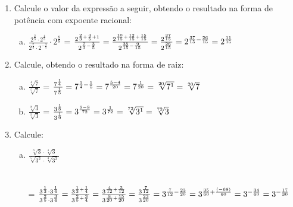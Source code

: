 \documentclass[a4paper,14pt]{article}
\begin{document}
\begin{multicols}{2}
\begin{enumerate}
\begin{enumerate}[a)]
        \end{enumerate}
        \item Calcule o valor da expressão a seguir, obtendo o resultado na forma de potência com expoente racional:
        \begin{enumerate}[a)]
        	\item $\frac{2^\frac{2}{3} \cdot 2^\frac{4}{5}}{2^\frac{7}{3} \cdot 2^{-\frac{3}{5}}} \cdot 2^\frac{8}{8}$ = $\frac{2^{\frac{2}{3} + \frac{4}{5} + 1}}{2^{\frac{7}{3} - \frac{3}{5}}} \\\\ = \frac{2^{\frac{10}{15} + \frac{12}{15} + \frac{15}{15}}}{2^{\frac{35}{15} - \frac{9}{15}}} = \frac{2^\frac{37}{15}}{2^\frac{26}{15}} = 2^{\frac{37}{15} - \frac{26}{15}} \\\\= 2^\frac{11}{15}$
        \end{enumerate}
        \item Calcule, obtendo o resultado na forma de raiz:
        \begin{enumerate}[a)]
        	\item $\frac{\sqrt[4]{7}}{\sqrt[5]{7}}$ = $\frac{7^\frac{1}{4}}{7^\frac{1}{5}} = 7^{\frac{1}{4} - \frac{1}{5}} = 7^\frac{5 - 4}{20} \\= 7^\frac{1}{20} = \sqrt[20]{7^1} = \sqrt[20]{7}$ \\
        	\item $\frac{\sqrt[8]{3}}{\sqrt[9]{3}}$ = $\frac{3^\frac{1}{8}}{3^\frac{1}{9}} = 3^\frac{9-8}{72} = 3^\frac{1}{72} \\= \sqrt[72]{3^1} = \sqrt[72]{3}$\\
        \end{enumerate}
        \item Calcule:
        \begin{enumerate}[a)]
            \item $\frac{\sqrt[3]{3} \cdot \sqrt[4]{3}}{\sqrt[5]{3^2} \cdot \sqrt[4]{3^3}}$ \\\\\\= $\frac{3^\frac{1}{3} \cdot 3^\frac{1}{4}}{3^\frac{2}{5} \cdot 3^\frac{3}{4}} = \frac{3^{\frac{1}{3} + \frac{1}{4}}}{3^{\frac{2}{5} + \frac{3}{4}}} = \frac{3^{\frac{4}{12} + \frac{3}{12}}}{3^{\frac{8}{20} + \frac{15}{20}}} \\\\\\= \frac{3^\frac{7}{12}}{3^\frac{23}{20}} = 3^{\frac{7}{12} - \frac{23}{20}} = 3^{\frac{35}{60} + \frac{(-69)}{60}} \\\\= 3^{-\frac{34}{60}} = 3^{-\frac{17}{30}}$ \\

\end{enumerate}
\end{enumerate}
\end{multicols}
\end{document}

